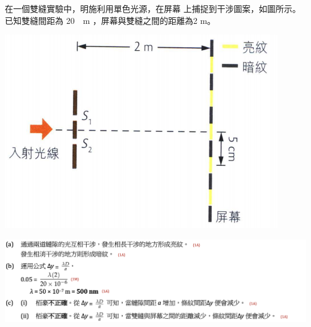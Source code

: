 {
    在一個雙縫實驗中，明施利用單色光源，在屏幕 上捕捉到干涉圖案，如圖所示。已知雙縫間距為 \qty{20}{\mu m} ，屏幕與雙縫之間的距離為2 m。
    \par{\par\centering\includegraphics[width=.4\textwidth]{./img/ch4_earlyclass_wave_lq_2024-05-14-14-14-14.png}\par}
}{
    \sol\par{\par\centering\includegraphics[width=\textwidth]{./img/ch4_earlyclass_wave_lq_2024-05-14-14-16-23.png}\par}
}

